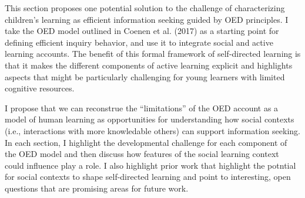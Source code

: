 \documentclass[english,man]{apa6}
\theoremstyle{definition}
\theoremstyle{definition}
\theoremstyle{definition}
\theoremstyle{remark}
\begin{document}
This section proposes one potential solution to the challenge of
characterizing children's learning as efficient information seeking
guided by OED principles. I take the OED model outlined in Coenen et al.
(2017) as a starting point for defining efficient inquiry behavior, and
use it to integrate social and active learning accounts. The benefit of
this formal framework of self-directed learning is that it makes the
different components of active learning explicit and highlights aspects
that might be particularly challenging for young learners with limited
cognitive resources.

I propose that we can reconstrue the \enquote{limitations} of the OED
account as a model of human learning as opportunities for understanding
how social contexts (i.e., interactions with more knowledable others)
can support information seeking. In each section, I highlight the
developmental challenge for each component of the OED model and then
discuss how features of the social learning context could influence play
a role. I also highlight prior work that highlight the potntial for
social contexts to shape self-directed learning and point to
interesting, open questions that are promising areas for future work.
\end{document}

